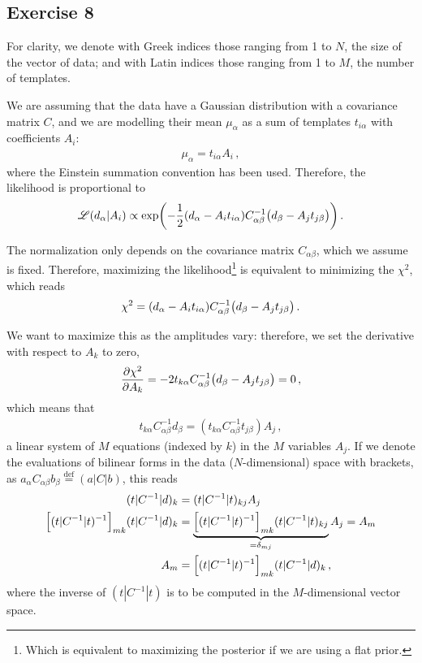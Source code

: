 \documentclass[main.tex]{subfiles}
\begin{document}
\subsection*{Exercise 8}

For clarity, we denote with Greek indices those ranging from 1 to \(N\), the size of the vector of data; and with Latin indices those ranging from 1 to \(M\), the number of templates.

We are assuming that the data have a Gaussian distribution with a covariance matrix \(C\), and we are modelling their mean \(\mu_\alpha  \) as a sum of templates \(t_{i \alpha}\) with coefficients \(A_i\):
%
\begin{align}
\mu _\alpha = t_{i \alpha } A_i
\,,
\end{align}
%
where the Einstein summation convention has been used. 
Therefore, the likelihood is proportional to 
%
\begin{align}
\mathscr{L}(d_\alpha | A_i) \propto \exp(- \frac{1}{2} \qty(d_\alpha - A_{i} t_{i \alpha }) C^{-1}_{\alpha \beta } 
\qty(d_\beta - A_j t_{j \beta }))
\,.
\end{align}

The normalization only depends on the covariance matrix \(C_{\alpha \beta }\), which we assume is fixed.
Therefore, maximizing the likelihood\footnote{Which is equivalent to maximizing the posterior if we are using a flat prior.} is equivalent to minimizing the \(\chi^2\), which reads 
%
\begin{align}
\chi^2 = \qty(d_\alpha - A_{i} t_{i \alpha }) C^{-1}_{\alpha \beta } 
\qty(d_\beta - A_j t_{j \beta })
\,.
\end{align}

We want to maximize this as the amplitudes vary: therefore, we set the derivative with respect to \(A_k\) to zero,
%
\begin{align}
\pdv{\chi^2}{A_k} = -2 t_{k \alpha } C^{-1}_{\alpha \beta } \qty(d_\beta - A_j t_{j \beta }) = 0
\,,
\end{align}
%
which means that 
%
\begin{align}
t_{k \alpha } C^{-1}_{\alpha \beta } d_\beta = (t_{k \alpha } C^{-1}_{\alpha \beta }  t_{j \beta }) A_j
\,,
\end{align}
%
a linear system of \(M\) equations (indexed by \(k\)) in the \(M\) variables \(A_j\). 
If we denote the evaluations of bilinear forms in the data (\(N\)-dimensional) space with brackets, as \(a_\alpha C_{\alpha \beta } b_\beta \overset{\text{def}}{=} (a | C |b)\), this reads 
%
\begin{align}
(t | C^{-1} | d)_k &= (t | C^{-1} | t)_{kj} A_j  \\
\qty[(t | C^{-1} | t)^{-1}]_{mk} (t | C^{-1} | d)_k  &=
\underbrace{ \qty[(t | C^{-1} | t)^{-1}]_{mk}
(t | C^{-1} | t)_{kj}}_{= \delta_{mj}} A_j = A_m  \\
A_m &= \qty[(t | C^{-1} | t)^{-1}]_{mk} (t | C^{-1} | d)_k
\,,
\end{align}
%
where the inverse of \((t | C^{-1} | t)\) is to be computed in the \(M\)-dimensional vector space. 
\end{document}
